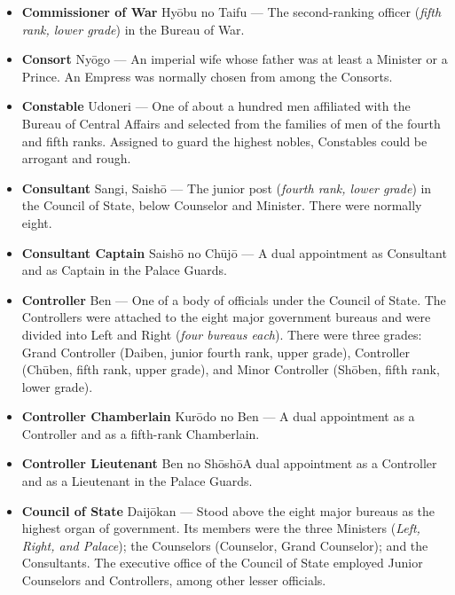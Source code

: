 \documentclass{article}
\begin{document}
\begin{multicols}{2}
\begin{small}
\begin{itemize}[
				label=,
				leftmargin=0em,
				rightmargin=-1.5em,
				itemindent=-2em,
			]
			\item \textbf{Commissioner of War} Hyōbu no Taifu --- The second-ranking officer (\textit{fifth rank, lower grade}) in the Bureau of War.

			\item \textbf{Consort} Nyōgo --- An imperial wife whose father was at least a Minister or a Prince. An Empress was normally chosen from among the Consorts.

			\item \textbf{Constable} Udoneri --- One of about a hundred men affiliated with the Bureau of Central Affairs and selected from the families of men of the fourth and fifth ranks. Assigned to guard the highest nobles, Constables could be arrogant and rough.

			\item \textbf{Consultant} Sangi, Saishō --- The junior post (\textit{fourth rank, lower grade}) in the Council of State, below Counselor and Minister. There were normally eight.

			\item \textbf{Consultant Captain} Saishō no Chūjō --- A dual appointment as Consultant and as Captain in the Palace Guards.

			\item \textbf{Controller} Ben --- One of a body of officials under the Council of State. The Controllers were attached to the eight major government bureaus and were divided into Left and Right (\textit{four bureaus each}). There were three grades: Grand Controller (Daiben, junior fourth rank, upper grade), Controller (Chūben, fifth rank, upper grade), and Minor Controller (Shōben, fifth rank, lower grade).

			\item \textbf{Controller Chamberlain} Kurōdo no Ben --- A dual appointment as a Controller and as a fifth-rank Chamberlain.

			\item \textbf{Controller Lieutenant} Ben no ShōshōA dual appointment as a Controller and as a Lieutenant in the Palace Guards.

			\item \textbf{Council of State} Daijōkan --- Stood above the eight major bureaus as the highest organ of government. Its members were the three Ministers (\textit{Left, Right, and Palace}); the Counselors (Counselor, Grand Counselor); and the Consultants. The executive office of the Council of State employed Junior Counselors and Controllers, among other lesser officials.


\end{itemize}
\end{small}
\end{multicols}
\end{document}
